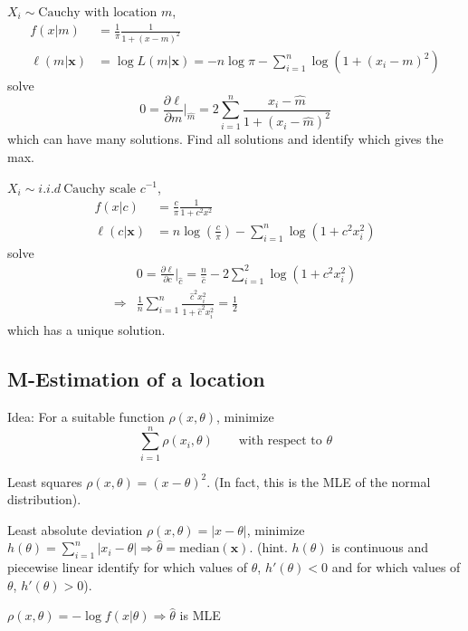 \documentclass[english, 11pt]{article}
\begin{document}
\begin{exmp}\label{exmp:318}
$X_i\sim\text{Cauchy with location } m$, 
$$
\begin{aligned}
f(x|m)&=\frac{1}{\pi}\frac{1}{1+(x-m)^2}\\
\ell(m|\bm{x})&=\log L(m|\bm{x})=-n\log\pi-\sum_{i=1}^n\log\left(1+(x_i-m)^2\right)
\end{aligned}
$$
solve
$$
0=\frac{\partial \ell}{\partial m}|_{\hat{m}}=2\sum_{i=1}^n\frac{x_i-\hat{m}}{1+(x_i-\hat{m})^2}
$$
which can have many solutions. Find all solutions and identify which gives the max.

$X_i\sim i.i.d~\text{Cauchy scale }c^{-1}$, 
$$
\begin{aligned}
f(x|c)&=\frac{c}{\pi}\frac{1}{1+c^2x^2}\\
\ell(c|\bm{x})&=n\log\left(\frac{c}{\pi}\right)-\sum_{i=1}^n\log(1+c^2x_i^2)
\end{aligned}
$$
solve
$$
\begin{aligned}
&0=\frac{\partial \ell}{\partial c}\big|_{\hat{c}}=\frac{n}{\hat{c}}-2\sum_{i=1}^2\log(1+c^2x_i^2)\\
\Rightarrow&\frac{1}{n}\sum_{i=1}^n\frac{\hat{c}^2x_i^2}{1+\hat{c}^2x_i^2}=\frac{1}{2}
\end{aligned}
$$
which has a unique solution.
\end{exmp}


\subsection{M-Estimation of a location}
Idea: For a suitable function $\rho(x, \theta)$, minimize
$$
\sum_{i=1}^n\rho(x_i, \theta)\qquad\text{with respect to }\theta
$$

\begin{exmp}
Least squares $\rho(x, \theta)=(x-\theta)^2$. (In fact, this is the MLE of the normal distribution).
\end{exmp}

\begin{exmp}
Least absolute deviation $\rho(x, \theta)=|x-\theta|$, minimize $h(\theta)=\sum_{i=1}^n|x_i-\theta|\Rightarrow \hat{\theta}=\text{median}(\bm{x})$. (hint. $h(\theta)$ is continuous and piecewise linear identify for which values of $\theta$, $h'(\theta)<0$ and for which values of $\theta$, $h'(\theta)>0$).
\end{exmp}



\begin{exmp}
$\rho(x, \theta)=-\log f(x|\theta)\Rightarrow \hat{\theta}$ is MLE
\end{exmp}
\end{document}

